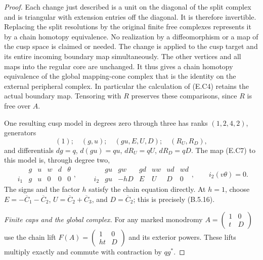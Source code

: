 \begin{proof}
Each change just described is a unit on the diagonal
of the split complex and is triangular with extension
entries off the diagonal. It is therefore invertible.
Replacing the split resolutions by the original finite
free complexes represents it by a chain homotopy
equivalence. No realization by a diffeomorphism or a
map of the cusp space is claimed or needed. The change
is applied to the cusp target and its entire incoming
boundary map simultaneously. The other vertices and
all maps into the regular core are unchanged. It thus
gives a chain homotopy equivalence of the global
mapping-cone complex that is the identity on the
external peripheral complex. In particular the
calculation of (E.C4) retains the actual boundary
map. Tensoring with $R$ preserves these comparisons,
since $R$ is free over $A$.

One resulting cusp model in degrees zero through three
has ranks $(1,2,4,2)$, generators
\[
 (1);\quad(g,u);\quad(gu,E,U,D);\quad(R_U,R_D),
\]
and differentials $dg=q$, $d(gu)=qu$,
$dR_U=qU$, $dR_D=qD$. The map (E.C7) to this model
is, through degree two,
\[
 \begin{array}{c|ccccc}
  &g&u&w&d&\theta\\ \hline
  i_1&g&u&0&0&0
 \end{array},\qquad
 \begin{array}{c|rrrrrr}
  &gu&gw&gd&uw&ud&wd\\ \hline
  i_2&gu&-hD&E&U&D&0
 \end{array},
 \qquad i_2(v\theta)=0.
 \tag{E.C12}
\]
The signs and the factor $h$ satisfy the chain equation
directly. At $h=1$, choose
$E=-\overline C_1-\overline C_2$,
$U=\overline C_2+\overline C_3$, and
$D=\overline C_2$; this is precisely (B.5.16).

\emph{Finite caps and the global complex.}
For any marked monodromy
$A=\left(\begin{smallmatrix}1&0\\t&D\end{smallmatrix}\right)$
use the chain lift
$F(A)=\left(\begin{smallmatrix}1&0\\ht&D\end{smallmatrix}\right)$
and its exterior powers. These lifts multiply exactly
and commute with contraction by $qg^*$.


\end{proof}
